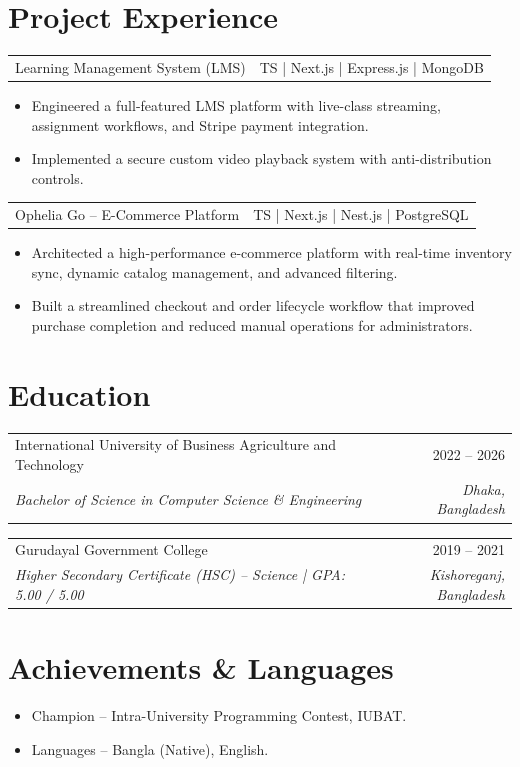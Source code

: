 \documentclass[letterpaper,12pt]{article}
\makeatletter
\newcommand{\semibold}[1]{{\fontseries{sb}\selectfont #1}}
\newcommand{\resumeSubheading}[4]{%
  \vspace{2pt}
  \begin{tabularx}{\linewidth}{@{}X r@{}}
    \semibold{#1} & \semibold{\normalsize #2} \\
    \textit{\normalsize #3} & \textit{\normalsize #4}
  \end{tabularx}
  \vspace{1pt}
}
\newcommand{\resumeItem}[1]{%
  \item #1
}
\newcommand{\projectHeading}[2]{%
  \vspace{2pt}
  \begin{tabularx}{\linewidth}{@{}X r@{}}
    \semibold{#1} & \semibold{\normalsize #2}
  \end{tabularx}
}
\newenvironment{resumeItemList}{%
  \begin{itemize}[leftmargin=0.18in, label=\textbullet, itemsep=1pt, topsep=1pt, parsep=0pt]
}{%
  \end{itemize}
}
\makeatother
\begin{document}
\section{Project Experience}

\projectHeading{Learning Management System (LMS)}{TS | Next.js | Express.js | MongoDB}
\begin{resumeItemList}
  \resumeItem{Engineered a full-featured LMS platform with live-class streaming, assignment workflows, and Stripe payment integration.}
  \resumeItem{Implemented a secure custom video playback system with anti-distribution controls.}
\end{resumeItemList}

\projectHeading{Ophelia Go -- E-Commerce Platform}{TS | Next.js | Nest.js | PostgreSQL}
\begin{resumeItemList}
  \resumeItem{Architected a high-performance e-commerce platform with real-time inventory sync, dynamic catalog management, and advanced filtering.}
  \resumeItem{Built a streamlined checkout and order lifecycle workflow that improved purchase completion and reduced manual operations for administrators.}
\end{resumeItemList}

\section{Education}

\resumeSubheading
  {International University of Business Agriculture and Technology}{2022 -- 2026}
  {Bachelor of Science in Computer Science \& Engineering}{Dhaka, Bangladesh}

\resumeSubheading
  {Gurudayal Government College}{2019 -- 2021}
  {Higher Secondary Certificate (HSC) -- Science | GPA: 5.00 / 5.00}{Kishoreganj, Bangladesh}

\section{Achievements \& Languages}
\begin{itemize}[leftmargin=0.18in, itemsep=1pt, topsep=1pt]
  \item \semibold{Champion} -- Intra-University Programming Contest, IUBAT.
  \item \semibold{Languages} -- Bangla (Native), English.
\end{itemize}
\end{document}
